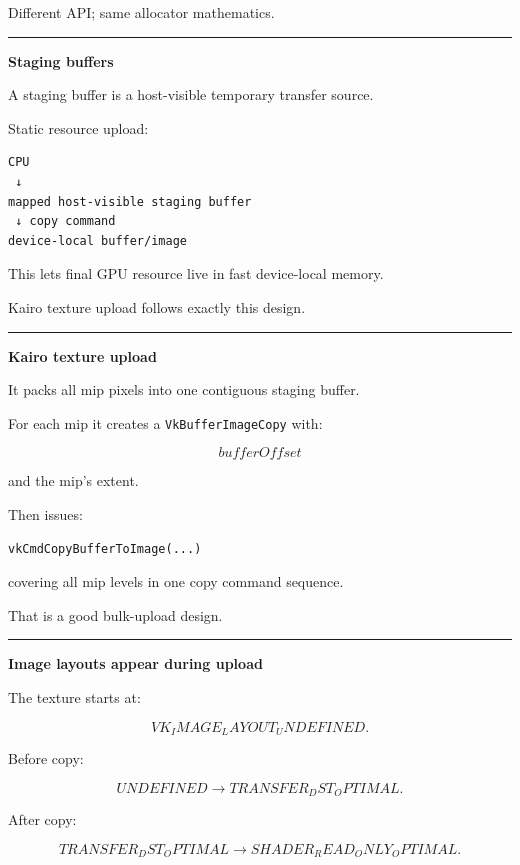 Different API; same allocator mathematics.

\begin{center}\rule{0.5\linewidth}{0.5pt}\end{center}

\textbf{Staging buffers}

A staging buffer is a host-visible temporary transfer source.

Static resource upload:

\begin{verbatim}
CPU
 ↓
mapped host-visible staging buffer
 ↓ copy command
device-local buffer/image
\end{verbatim}

This lets final GPU resource live in fast device-local memory.

Kairo texture upload follows exactly this design.

\begin{center}\rule{0.5\linewidth}{0.5pt}\end{center}

\textbf{Kairo texture upload}

It packs all mip pixels into one contiguous staging buffer.

For each mip it creates a \texttt{VkBufferImageCopy} with:

\[
bufferOffset
\]

and the mip's extent.

Then issues:

\begin{verbatim}
vkCmdCopyBufferToImage(...)
\end{verbatim}

covering all mip levels in one copy command sequence.

That is a good bulk-upload design.

\begin{center}\rule{0.5\linewidth}{0.5pt}\end{center}

\textbf{Image layouts appear during upload}

The texture starts at:

\[
VK_IMAGE_LAYOUT_UNDEFINED.
\]

Before copy:

\[
\boxed{
UNDEFINED
\rightarrow
TRANSFER_DST_OPTIMAL.
}
\]

After copy:

\[
\boxed{
TRANSFER_DST_OPTIMAL
\rightarrow
SHADER_READ_ONLY_OPTIMAL.
}
\]

